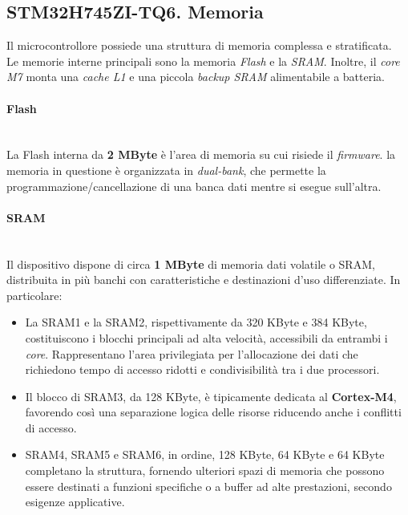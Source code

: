 

\subsection{STM32H745ZI-TQ6. Memoria}
Il microcontrollore possiede una struttura di memoria complessa e stratificata.\\
Le memorie interne principali sono la memoria \textit{Flash} e la \textit{SRAM}. Inoltre, il \textit{core M7} monta una \textit{cache L1} e una piccola \textit{backup SRAM} alimentabile a batteria.

\paragraph{\small{Flash}}\mbox{}\\
La Flash interna da \textbf{2 MByte} è l'area di memoria su cui risiede il \textit{firmware}. la memoria in questione è organizzata in \textit{dual-bank}, che permette la programmazione/cancellazione di una banca dati mentre si esegue sull'altra.

\paragraph{\small{SRAM}}\mbox{}\\
Il dispositivo dispone di circa \textbf{1 MByte} di memoria dati volatile o SRAM, distribuita in più banchi con caratteristiche e destinazioni d'uso differenziate. In particolare:
\begin{itemize}
    \item La SRAM1 e la SRAM2, rispettivamente da 320 KByte e 384 KByte, costituiscono i blocchi principali ad alta velocità, accessibili da entrambi i \textit{core}. Rappresentano l'area privilegiata per l'allocazione dei dati che richiedono tempo di accesso ridotti e condivisibilità tra i due processori.
    \item Il blocco di SRAM3, da 128 KByte, è tipicamente dedicata al \textbf{Cortex-M4}, favorendo così una separazione logica delle risorse riducendo anche i conflitti di accesso. 
    \item SRAM4, SRAM5 e SRAM6, in ordine, 128 KByte, 64 KByte e 64 KByte completano la struttura, fornendo ulteriori spazi di memoria che possono essere destinati a funzioni specifiche o a buffer ad alte prestazioni, secondo esigenze applicative.
\end{itemize}

